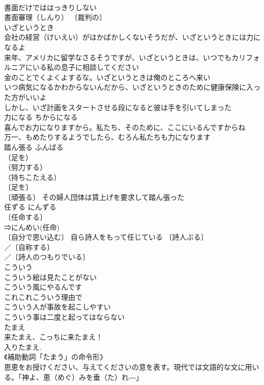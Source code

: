 \documentclass[8pt]{extreport}
\begin{document}
\begin{CJK}{UTF8}{min}
\\	書面だけでははっきりしない 
\\	書面審理（しんり） 〔裁判の〕
\\	いざというとき		
\\	会社の経営（けいえい）がはかばかしくないそうだが、いざというときには力になるよ 
\\	来年、アメリカに留学なさるそうですが、いざというときは、いつでもカリフォルニアにいる私の息子に相談してください 
\\	金のことでくよくよするな。いざというときは俺のところへ来い 
\\	いつ病気になるかわからないんだから、いざというときのために健康保険に入った方がいいよ 
\\	しかし、いざ計画をスタートさせる段になると彼は手を引いてしまった 
\\	力になる	ちからになる	
\\	喜んでお力になりますから。私たち、そのために、ここにいるんですからね 
\\	万一、もめたりするようでしたら、むろん私たちも力になります 
\\	踏ん張る	ふんばる	
\\	（足を）
\\	（努力する）
\\	（持ちこたえる）
\\	〔足を〕
\\	〔頑張る〕 その婦人団体は賃上げを要求して踏ん張った 
\\	任ずる	にんずる	
\\	〔任命する〕
\\	⇒にんめい(任命) 
\\	〔自分で思い込む〕 自ら詩人をもって任じている 〔詩人ぶる〕
\\	／〔自称する〕
\\	／〔詩人のつもりでいる〕
\\	こういう		
\\	こういう絵は見たことがない 
\\	こういう風にやるんです 
\\	これこれこういう理由で 
\\	こういう人が事故を起こしやすい 
\\	こういう事は二度と起ってはならない 
\\	たまえ		
\\	来たまえ、こっちに来たまえ！ 
\\	入りたまえ. 
\\	《補助動詞「たまう」の命令形》 
\\	恩恵をお授けください、与えてくださいの意を表す。現代では文語的な文に用いる。「神よ、恵（めぐ）みを垂（た）れ―」 

\end{CJK}
\end{document}
